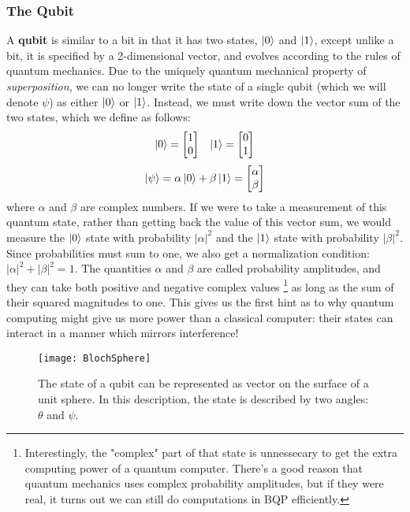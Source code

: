\subsubsection{The Qubit}
A \textbf{qubit} is similar to a bit in that it has two states, $\ket{0}$ and $\ket{1}$, except unlike a bit, it is specified
by a 2-dimensional vector, and evolves according to the rules of quantum mechanics. Due to the uniquely quantum
mechanical property of \emph{superposition}, we can no longer write the state of a single qubit (which we will
denote $\psi$) as either $\ket{0}$ or $\ket{1}$. Instead, we must write down the vector sum of the two states,
which we define as follows:
\begin{align}
  \label{eqn:basisstates}
  \ket{0} = \begin{bmatrix}1\\0\end{bmatrix} && \ket{1} = \begin{bmatrix}0\\1\end{bmatrix}
\end{align}
\begin{equation}
  \ket{\psi} = \alpha \ket{0} + \beta \ket{1} = \begin{bmatrix}\alpha\\\beta\end{bmatrix}
\end{equation}
where $\alpha$ and $\beta$ are complex numbers. If we were to take a measurement of this quantum state,
rather than getting back the value of this vector sum, we would measure the $\ket{0}$ state with probability
$|\alpha|^2$ and the $\ket{1}$ state with probability $|\beta|^2$. Since probabilities must sum to one, we also
get a normalization condition: $|\alpha|^2 + |\beta|^2 = 1$. The quantities $\alpha$ and $\beta$ are called
probability amplitudes, and they can take both positive and negative complex values
\footnote{Interestingly, the "complex" part of that state is unnessecary to get the extra computing power
  of a quantum computer\cite{doi:10.1142/S0219749913500019}. There's a good reason that quantum mechanics 
  uses complex probability amplitudes\cite{2004quant.ph..1062A}, but if they were real, it turns out
  we can still do computations in \textsc{BQP} efficiently.} 
as long as the sum of their squared magnitudes to one. This gives us the first hint as to why quantum computing
might give us more power than a classical computer: their states can interact in a manner which mirrors
interference!

\begin{figure}
  \texttt{[image: BlochSphere]}
  \caption[The Bloch Sphere representation of a qubit]
  {The state of a qubit can be represented as vector on the surface of a unit sphere. In this description, 
  the state is described by two angles: $\theta$ and $\psi$.}
  \label{fig:bloch}
\end{figure}

